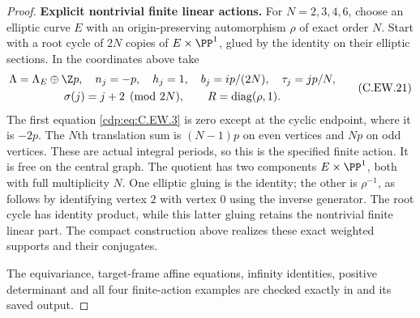 \begin{proof}
\par\medskip\noindent\textbf{Explicit nontrivial finite linear actions.}
For $N=2,3,4,6$, choose an elliptic curve $E$ with
an origin-preserving automorphism $\rho$ of exact
order $N$. Start with a root cycle of $2N$ copies
of $E\times\PP^1$, glued by the identity on their
elliptic sections. In the coordinates above take
\[
 \begin{gathered}
 \Lambda=\Lambda_E\oplus\Z p,\quad
 n_j=-p,\quad h_j=1,\quad
 b_j=ip/(2N),\quad \tau_j=j p/N,\\
 \sigma(j)=j+2\pmod{2N},\qquad
 R=\operatorname{diag}(\rho,1).
 \end{gathered}
\tag{C.EW.21}\label{cdp:eq:C.EW.21}
\]
The first equation \eqref{cdp:eq:C.EW.3} is zero except at the
cyclic endpoint, where it is $-2p$.
The $N$th translation sum is $(N-1)p$ on even
vertices and $Np$ on odd vertices. These are
actual integral periods, so this is the specified
finite action. It is free on the central graph.
The quotient has two components $E\times\PP^1$,
both with full multiplicity $N$. One elliptic
gluing is the identity; the other is $\rho^{-1}$,
as follows by identifying vertex $2$ with vertex
$0$ using the inverse generator. The root cycle
has identity product, while this latter gluing
retains the nontrivial finite linear part.
The compact construction above realizes these
exact weighted supports and their conjugates.

The equivariance, target-frame affine equations,
infinity identities, positive determinant and
all four finite-action examples are checked
exactly in 
and its saved output.
\end{proof}


